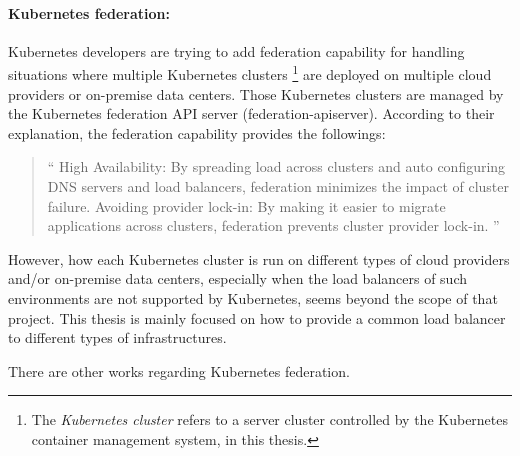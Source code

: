\paragraph{\bf Kubernetes federation:}

Kubernetes developers are trying to add federation \cite{K8sFederation2017} capability for handling situations 
where multiple Kubernetes clusters \footnote{The {\em Kubernetes cluster} refers to a server cluster 
controlled by the Kubernetes container management system, in this thesis.} 
are deployed on multiple cloud providers or on-premise data centers. 
Those Kubernetes clusters are managed by the Kubernetes federation API server (federation-apiserver).
According to their explanation\cite{K8sFederation2017}, the federation capability provides the followings: 
\begin{quote}
\enquote{
High Availability: By spreading load across clusters and auto configuring DNS servers and load balancers, federation minimizes the impact of cluster failure.
Avoiding provider lock-in: By making it easier to migrate applications across clusters, federation prevents cluster provider lock-in.
}
\end{quote}

However, how each Kubernetes cluster is run on different types of cloud providers
and/or on-premise data centers, especially when the load balancers of such environments are not supported by Kubernetes, 
seems beyond the scope of that project.
This thesis is mainly focused on how to provide a common load balancer to different types of infrastructures.

There are other works \cite{kim2019tosca,goethals2019fuse} regarding Kubernetes federation. 

